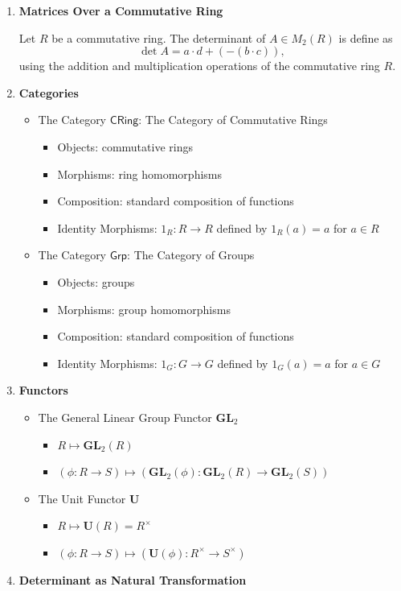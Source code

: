 \documentclass[11pt,openany]{article}
\begin{document}
\begin{example}[Determinant]
\begin{enumerate}
	The determinant is restricted to invertible matrices:
	\[
	\det:\text{GL}(2,\R)\to \R^{\times},
	\] where $\R^{\times}$ is the set of nonzero real numbers under multiplication. The determinant preserves the group operation because because of the multiplicative property: \[
	\det(A*B)=\det(A)\cdot\det(B).
	\] for all $A,B\in\text{GL}(2,\R)$. 
	\vfill
	\item \textbf{\large Matrices Over a Commutative Ring}
	
	Let $R$ be a commutative ring. The determinant of $A\in M_2(R)$ is define as \[
	\det A = a\cdot d + (-(b\cdot c)),
	\] using the addition and multiplication operations of the commutative ring $R$.
	\vfill
	\item \textbf{\large Categories}
	\begin{itemize}
		\item The Category $\mathsf{CRing}$: The Category of Commutative Rings
		\begin{itemize}
			\item Objects: commutative rings
			\item Morphisms: ring homomorphisms
			\item Composition: standard composition of functions
			\item Identity Morphisms: $1_R:R\to R$ defined by $1_R(a)=a$ for $a\in R$
		\end{itemize}
		\item The Category $\mathsf{Grp}$: The Category of Groups
		\begin{itemize}
			\item Objects: groups
			\item Morphisms: group homomorphisms
			\item Composition: standard composition of functions
			\item Identity Morphisms: $1_G:G\to G$ defined by $1_G(a)=a$ for $a\in G$
		\end{itemize}
	\end{itemize}
	\newpage
	\item \textbf{\large Functors}
	\begin{itemize}
		\item The General Linear Group Functor $\mathbf{GL}_2$
		\begin{itemize}
			\item $R\mapsto \textbf{GL}_2(R)$
			\item $(\phi:R\to S)\mapsto (\textbf{GL}_2(\phi):\textbf{GL}_2(R)\to\textbf{GL}_2(S))$
		\end{itemize}
		\item The Unit Functor $\mathbf{U}$
		\begin{itemize}
			\item $R\mapsto \textbf{U}(R)=R^{\times}$
			\item $(\phi:R\to S)\mapsto (\textbf{U}(\phi):R^\times\to S^{\times})$
		\end{itemize}
	\end{itemize}
	\item \textbf{\large Determinant as Natural Transformation}
	

\end{enumerate}
\end{example}
\end{document}
